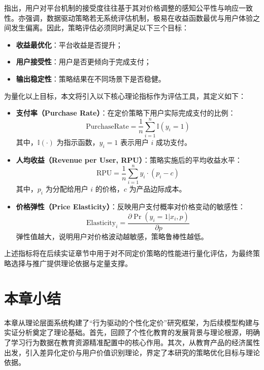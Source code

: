 \cite{von_hippel_2005}指出，用户对平台机制的接受度往往基于其对价格调整的感知公平性与响应一致性。\cite{shugan_2004}亦强调，数据驱动策略若无系统评估机制，极易在收益函数最优与用户体验之间发生偏离。因此，策略评估必须同时满足以下三个目标：

\begin{itemize}
  \item \textbf{收益最优化}：平台收益是否提升；
  \item \textbf{用户接受性}：用户是否更倾向于完成支付；
  \item \textbf{输出稳定性}：策略结果在不同场景下是否稳健。
\end{itemize}

为量化以上目标，本文将引入以下核心理论指标作为评估工具，其定义如下：

\begin{itemize}
  \item \textbf{支付率（Purchase Rate）}：在定价策略下用户实际完成支付的比例：
  \begin{equation}
    \text{PurchaseRate} = \frac{1}{n} \sum_{i=1}^{n} \mathbb{I}(y_i = 1)
  \end{equation}
  其中，$\mathbb{I}(\cdot)$ 为指示函数，$y_i=1$ 表示用户 $i$ 成功支付。

  \item \textbf{人均收益（Revenue per User, RPU）}：策略实施后的平均收益水平：
  \begin{equation}
    \text{RPU} = \frac{1}{n} \sum_{i=1}^{n} y_i \cdot (p_i - c)
  \end{equation}
  其中，$p_i$ 为分配给用户 $i$ 的价格，$c$ 为产品边际成本。

  \item \textbf{价格弹性（Price Elasticity）}：反映用户支付概率对价格变动的敏感性：
  \begin{equation}
    \text{Elasticity}_i = \frac{\partial \Pr(y_i = 1 | x_i, p)}{\partial p}
  \end{equation}
  弹性值越大，说明用户对价格波动越敏感，策略鲁棒性越低。

\end{itemize}

上述指标将在后续实证章节中用于对不同定价策略的性能进行量化评估，为最终策略选择与推广提供理论依据与定量支撑。

\section*{本章小结}

本章从理论层面系统构建了“行为驱动的个性化定价”研究框架，为后续模型构建与实证分析奠定了理论基础。首先，回顾了个性化教育的发展背景与理论根源，明确了学习行为数据在教育资源精准配置中的核心作用。其次，从教育产品的经济属性出发，引入差异化定价与用户价值识别理论，界定了本研究的策略优化目标与理论依据。

